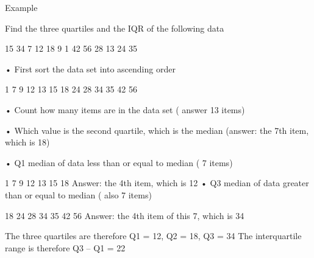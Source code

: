 





Example

Find the three quartiles and the IQR of the following data

 15  34  7  12  18  9  1  42  56  28  13  24  35

•	First sort the data set into ascending order

1 7  9 12 13 15 18  24 28 34 35 42 56

•	Count how many items are in the data set ( answer 13 items)

•	Which value is the second quartile, which is the median (answer: the 7th item, which is 18)

•	Q1  median of data less than or equal to median ( 7 items)

1	7  9 12 13 15 18 
 Answer: the 4th item, which is 12
•	Q3  median of data greater than or equal to median ( also 7 items)

18  24 28 34 35 42 56 
Answer: the 4th item of this 7, which is 34

The three quartiles are therefore Q1 = 12, Q2 = 18, Q3 = 34
The interquartile range is therefore Q3 – Q1 = 22


